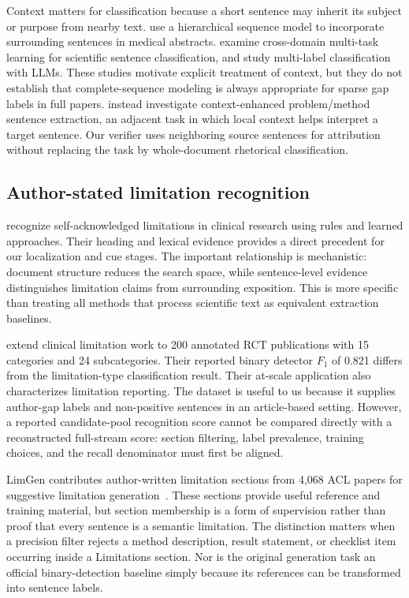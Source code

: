 Context matters for classification because a short sentence may inherit its subject or purpose
from nearby text. \citet{jin2018hierarchical} use a hierarchical sequence model to incorporate
surrounding sentences in medical abstracts. \citet{brack2024sequential} examine cross-domain
multi-task learning for scientific sentence classification, and \citet{lan2024multilabel} study
multi-label classification with LLMs. These studies motivate explicit treatment of context, but
they do not establish that complete-sequence modeling is always appropriate for sparse gap labels
in full papers. \citet{zhang2024extracting} instead investigate context-enhanced problem/method
sentence extraction, an adjacent task in which local context helps interpret a target sentence.
Our verifier uses neighboring source sentences for attribution without replacing the task by
whole-document rhetorical classification.

\subsection{Author-stated limitation recognition}
\label{S:rw-authorstated}

\citet{kilicoglu2018automatic} recognize self-acknowledged limitations in clinical research using
rules and learned approaches. Their heading and lexical evidence provides a direct precedent for
our localization and cue stages. The important relationship is mechanistic: document structure
reduces the search space, while sentence-level evidence distinguishes limitation claims from
surrounding exposition. This is more specific than treating all methods that process scientific
text as equivalent extraction baselines.

\citet{lan2024automatic} extend clinical limitation work to 200 annotated RCT publications with
15 categories and 24 subcategories. Their reported binary detector $F_1$ of 0.821 differs from the
limitation-type classification result. Their at-scale application also characterizes limitation
reporting. The dataset is useful to us because it supplies author-gap labels and non-positive
sentences in an article-based setting. However, a reported candidate-pool recognition score cannot
be compared directly with a reconstructed full-stream score: section filtering, label prevalence,
training choices, and the recall denominator must first be aligned.

LimGen contributes author-written limitation sections from 4,068 ACL papers for suggestive
limitation generation~\citep{faizullah2024limgen}. These sections provide useful reference and
training material, but section membership is a form of supervision rather than proof that every
sentence is a semantic limitation. The distinction matters when a precision filter rejects a
method description, result statement, or checklist item occurring inside a Limitations section.
Nor is the original generation task an official binary-detection baseline simply because its
references can be transformed into sentence labels.

